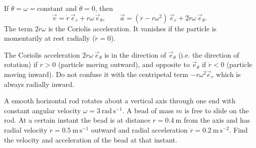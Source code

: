 \documentclass[11pt]{article}
\begin{document}
\begin{propriete}
If $\dot{\theta} = \omega = \text{constant}$ and $\ddot{\theta}=0$, then
\[
\vec{v} = \dot{r}\,\vec{e}_r + r\omega\,\vec{e}_\theta,
\qquad
\vec{a} = (\ddot{r} - r\omega^2)\,\vec{e}_r + 2\dot{r}\omega\,\vec{e}_\theta.
\]
The term $2\dot{r}\omega$ is the Coriolis acceleration.  It vanishes if the particle is momentarily at rest radially ($\dot{r}=0$).
\end{propriete}

\begin{attention}
The Coriolis acceleration $2\dot{r}\omega\,\vec{e}_\theta$ is in the direction of $\vec{e}_\theta$ (i.e. the direction of rotation) if $\dot{r}>0$ (particle moving outward), and opposite to $\vec{e}_\theta$ if $\dot{r}<0$ (particle moving inward).  Do not confuse it with the centripetal term $-r\omega^2\vec{e}_r$ which is always radially inward.
\end{attention}

\begin{exemplebox}
A smooth horizontal rod rotates about a vertical axis through one end with constant angular velocity $\omega = 3\ \mathrm{rad\,s^{-1}}$.  A bead of mass $m$ is free to slide on the rod.  At a certain instant the bead is at distance $r = 0.4\ \mathrm{m}$ from the axis and has radial velocity $\dot{r} = 0.5\ \mathrm{m\,s^{-1}}$ outward and radial acceleration $\ddot{r} = 0.2\ \mathrm{m\,s^{-2}}$.  Find the velocity and acceleration of the bead at that instant.
\end{exemplebox}
\end{document}
